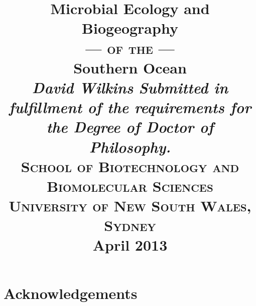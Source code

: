 \documentclass[a4paper]{book}
\begin{document}
\date{}
\title{
  \bigskip
  \Huge{Microbial Ecology and Biogeography}\\ \medskip \vspace{1 mm} \smallskip \smallskip \Large{\textsc{--- of the ---}}\\ \medskip \Huge{Southern Ocean}\\
  \bigskip
  \bigskip
  \bigskip
  \bigskip
  \bigskip
  \bigskip
  \bigskip
  \bigskip
  \huge{\textit{David Wilkins}}
  \vfill
  \small{
    \smallskip
    \textit{Submitted in fulfillment of the requirements for the Degree of Doctor of Philosophy.}\\
    \medskip
    \textsc{School of Biotechnology and Biomolecular Sciences\\
    University of New South Wales, Sydney}\\
    \medskip
    \large{\textbf{April 2013}}\\
    \smallskip
  }
  \medskip
}

\maketitle


\singlespacing



\onehalfspacing

\singlespacing

\tableofcontents

\listoffigures
{}

\listoftables
{}

\printglossary[type=\acronymtype]

\onehalfspacing
\chapter*{Acknowledgements}

\clearpage
{}

\glsresetall


\glsresetall


\glsresetall


\glsresetall


\glsresetall


\glsresetall


\singlespacing
{}


\end{document}
